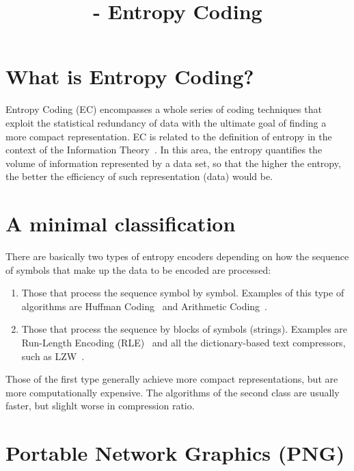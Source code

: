 


\title{\SM{} - Entropy Coding}

\maketitle

\tableofcontents

\section{What is Entropy Coding?}

Entropy Coding (EC) encompasses a whole series of coding techniques
that exploit the statistical redundancy of data with the ultimate goal
of finding a more compact representation. EC is related to the
definition of entropy in the context of the Information
Theory~\cite{vruiz__information_theory}. In this area, the entropy
quantifies the volume of information represented by a data set, so
that the higher the entropy, the better the efficiency of such
representation (data) would be.

\section{A minimal classification}

There are basically two types of entropy encoders depending on how the
sequence of symbols that make up the data to be encoded are processed:

\begin{enumerate}
\item Those that process the sequence symbol by symbol. Examples of
  this type of algorithms are Huffman
  Coding~\cite{vruiz__huffman_coding} and Arithmetic
  Coding~\cite{vruiz__arithmetic_coding}.
\item Those that process the sequence by blocks of symbols
  (strings). Examples are Run-Length Encoding (RLE)~\cite{vruiz__rle}
  and all the dictionary-based text compressors, such as
  LZW~\cite{vruiz__LZW}.
\end{enumerate}
  
Those of the first type generally achieve more compact
representations, but are more computationally expensive. The
algorithms of the second class are usually faster, but slighlt worse
in compression ratio.

\section{Portable Network Graphics (PNG)}

